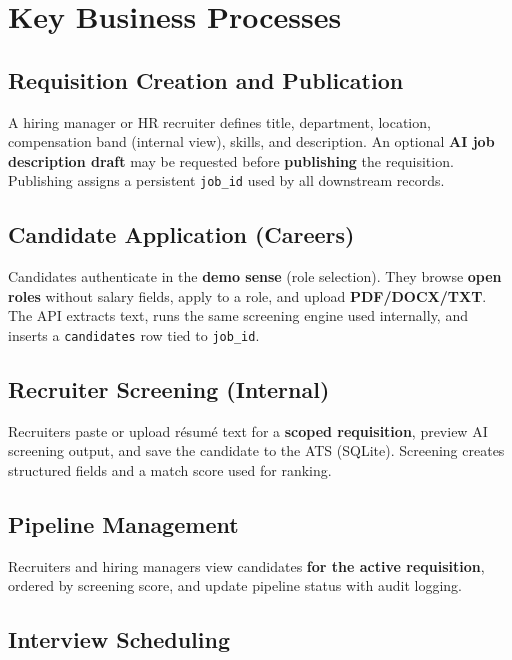 \documentclass[12pt]{article}
\begin{document}
\section{Key Business Processes}
\label{sec:processes}

\subsection{Requisition Creation and Publication}

A hiring manager or HR recruiter defines title, department, location, compensation band (internal view), skills, and description. An optional \textbf{AI job description draft} may be requested before \textbf{publishing} the requisition. Publishing assigns a persistent \texttt{job\_id} used by all downstream records.

\subsection{Candidate Application (Careers)}

Candidates authenticate in the \textbf{demo sense} (role selection). They browse \textbf{open roles} without salary fields, apply to a role, and upload \textbf{PDF/DOCX/TXT}. The API extracts text, runs the same screening engine used internally, and inserts a \texttt{candidates} row tied to \texttt{job\_id}.

\subsection{Recruiter Screening (Internal)}

Recruiters paste or upload résumé text for a \textbf{scoped requisition}, preview AI screening output, and save the candidate to the ATS (SQLite). Screening creates structured fields and a match score used for ranking.

\subsection{Pipeline Management}

Recruiters and hiring managers view candidates \textbf{for the active requisition}, ordered by screening score, and update pipeline status with audit logging.

\subsection{Interview Scheduling}
\end{document}
